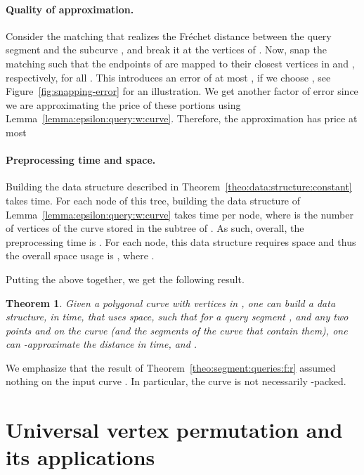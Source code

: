 \documentclass[12pt]{article}
\newtheorem{theorem}{Theorem}[section]
\newcommand{\seclab}[1]{\label{sec:#1}}
\newcommand{\thmlab}[1]{{\label{theo:#1}}}
\newcommand{\thmref}[1]{Theorem~\ref{theo:#1}}
\newcommand{\lemref}[1]{Lemma~\ref{lemma:#1}}
\newcommand{\figref}[1]{Figure~\ref{fig:#1}}
\newcommand{\Frechet}{Fr\'{e}c{h}e{}t\xspace}\providecommand{\Arr}{\mathop{\mathrm{\EuScript{A}}}}
\numberwithin{figure}{section}
\numberwithin{equation}{section}
\newcommand{\matching}{matching\xspace}
\begin{document}
\paragraph{Quality of approximation.}

Consider the \matching{} that realizes the \Frechet distance between
the query segment  and the subcurve , and
break it at the vertices of . Now, snap the matching
such that the endpoints of  are mapped to
their closest vertices in  and , respectively, for all
. This introduces an error of at most , if we choose , see \figref{snapping-error} for an illustration.  We get
another factor of  error since we are
approximating the price of these portions using
\lemref{epsilon:query:w:curve}. Therefore, the approximation has price
at most



\paragraph{Preprocessing time and space.}
Building the data structure described in
\thmref{data:structure:constant} takes  time. For each
node  of this tree, building the data structure of
\lemref{epsilon:query:w:curve} takes  time per node, where  is the number of
vertices of the curve stored in the subtree of . As such, overall,
the preprocessing time is . For each
node, this data structure requires  space and
thus the overall space usage is , where
.




Putting the above together, we get the following result.

\begin{theorem}\thmlab{segment:queries:f:r}Given a polygonal curve  with  vertices in , one
    can build a data structure, in 
    time, that uses  space, such that for a
    query segment , and any two points  and  on the
    curve (and the segments of the curve that contain them), one can
    -approximate the distance
     in  time, and .
\end{theorem}

We emphasize that the result of \thmref{segment:queries:f:r} assumed
nothing on the input curve . In particular, the curve  is
not necessarily -packed.



\section{Universal vertex permutation and its applications}
\seclab{f:r:simpl}
\end{document}
